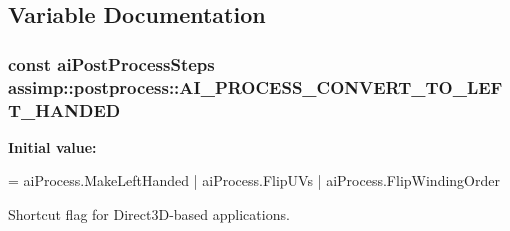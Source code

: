 \subsection{Variable Documentation}
\hypertarget{namespaceassimp_1_1postprocess_acc154572eeb907621edff6a9ae360734}{
\subsubsection[{A\+I\+\_\+\+P\+R\+O\+C\+E\+S\+S\+\_\+\+C\+O\+N\+V\+E\+R\+T\+\_\+\+T\+O\+\_\+\+L\+E\+F\+T\+\_\+\+H\+A\+N\+D\+E\+D}]{\setlength{\rightskip}{0pt plus 5cm}const {\bf ai\+Post\+Process\+Steps} assimp\+::postprocess\+::\+A\+I\+\_\+\+P\+R\+O\+C\+E\+S\+S\+\_\+\+C\+O\+N\+V\+E\+R\+T\+\_\+\+T\+O\+\_\+\+L\+E\+F\+T\+\_\+\+H\+A\+N\+D\+E\+D}}\label{namespaceassimp_1_1postprocess_acc154572eeb907621edff6a9ae360734}
{\bfseries Initial value\+:}
\begin{DoxyCode}
=
      aiProcess.MakeLeftHanded |
      aiProcess.FlipUVs |
      aiProcess.FlipWindingOrder
\end{DoxyCode}
Shortcut flag for Direct3\+D-\/based applications.

